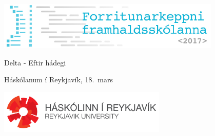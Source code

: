 \documentclass[12pt,a4paper]{problemset}
\begin{document}
\begin{titlepage}
    \centering
    \includegraphics[width=0.8\textwidth]{fklogo}\\
    \vspace{1cm}
    {\Huge Delta - Eftir hádegi \par}
    \vspace{0.5cm}
    {\LARGE Háskólanum í Reykjavík, 18.\ mars \par}
    \vspace{2cm}
    { \Huge \tableofcontents }
    \vfill
    \includegraphics[width=0.6\textwidth]{horizontal_white.png}
\end{titlepage}

\setcounter{problemcount}{6}

\end{document}
